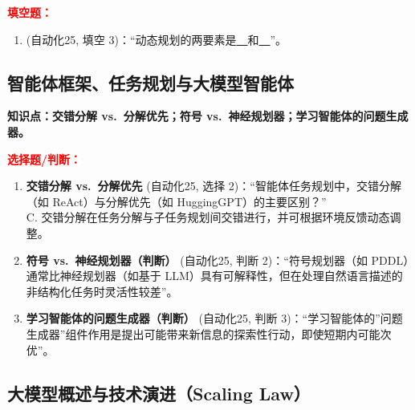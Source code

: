 ﻿\documentclass[../main.tex]{subfiles}
\begin{document}
\noindent\textbf{\textcolor{red}{填空题：}}
\begin{enumerate}[itemsep=0.3em, topsep=0.2em, leftmargin=1.5em]
    \item \textcolor{autoclassgreen}{(自动化25, 填空 3)}：``动态规划的两要素是\underline{\ \ }和\underline{\ \ }''。 
\end{enumerate}

\subsection{智能体框架、任务规划与大模型智能体}

\noindent\textbf{知识点：交错分解 vs.\ 分解优先；符号 vs.\ 神经规划器；学习智能体的问题生成器。}

\noindent\textbf{\textcolor{red}{选择题/判断：}}
\begin{enumerate}[itemsep=0.45em, topsep=0.2em, leftmargin=1.5em]
    \item \textbf{交错分解 vs.\ 分解优先} \textcolor{autoclassgreen}{(自动化25, 选择 2)}：``智能体任务规划中，交错分解（如 ReAct）与分解优先（如 HuggingGPT）的主要区别？''\\
    \quad {}\quad C. 交错分解在任务分解与子任务规划间交错进行，并可根据环境反馈动态调整\quad {}。 

    \item \textbf{符号 vs.\ 神经规划器（判断）} \textcolor{autoclassgreen}{(自动化25, 判断 2)}：``符号规划器（如 PDDL）通常比神经规划器（如基于 LLM）具有可解释性，但在处理自然语言描述的非结构化任务时灵活性较差''。 

    \item \textbf{学习智能体的问题生成器（判断）} \textcolor{autoclassgreen}{(自动化25, 判断 3)}：``学习智能体的''问题生成器''组件作用是提出可能带来新信息的探索性行动，即使短期内可能次优''。 
\end{enumerate}

\subsection{大模型概述与技术演进（Scaling Law）}
\end{document}
